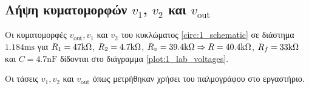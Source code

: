 \subsection{Λήψη κυματομορφών $v_1$, $v_2$ και $v_{\mathrm{out}}$}
		Οι κυματομορφές $v_{\mathrm{out}}, v_1$ και $v_2$ του κυκλώματος \ref{circ:1_schematic} σε διάστημα  $1.184\unit{\milli\second}$ για $R_1=47\kohm$, $R_2=4.7\kohm$, $R_v=39.4\kohm\Rightarrow R=40.4\kohm$, $R_f=33\kohm$ και $C=4.7\unit{\nano\farad}$ δίδονται στο διάγραμμα \ref{plot:1_lab_voltages}.

		\begin{plot_fig}[H]
			\begin{center}
				
				\caption{Οι τάσεις $v_1, v_2$ και $v_{\mathrm{out}}$ όπως μετρήθηκαν χρήσει του παλμογράφου στο εργαστήριο.}
				\label{plot:1_lab_voltages}
			\end{center}
		\end{plot_fig}